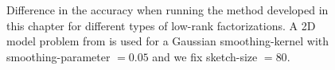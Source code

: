 \begin{figure}[ht]
    \centering
    
    \caption{Difference in the accuracy when running the method developed in this
    chapter for different types of low-rank factorizations.
    A 2D model problem from 
    is used for a Gaussian \gls{smoothing-kernel} with \gls{smoothing-parameter} $=0.05$
    and we fix \gls{sketch-size} $=80$.}
    \label{fig:3-nystrom-other-approximations}
\end{figure}

